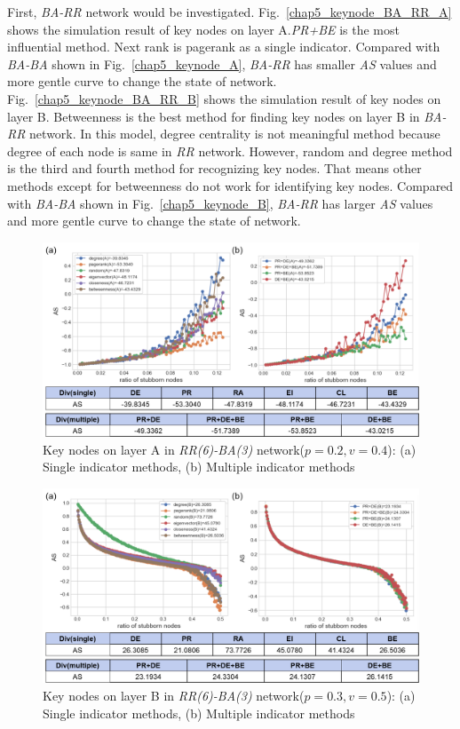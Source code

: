 First, \textit{BA-RR} network would be investigated. Fig.~\ref{chap5_keynode_BA_RR_A} shows the simulation result of key nodes on layer A.\textit{PR+BE} is the most influential method. Next rank is pagerank as a single indicator. Compared with \textit{BA-BA} shown in Fig.~\ref{chap5_keynode_A}, \textit{BA-RR} has smaller \textit{AS} values and more gentle curve to change the state of network. \\
Fig.~\ref{chap5_keynode_BA_RR_B} shows the simulation result of key nodes on layer B. Betweenness is the best method for finding key nodes on layer B in \textit{BA-RR} network. In this model, degree centrality is not meaningful method because degree of each node is same in \textit{RR} network. However, random and degree method is the third and fourth method for recognizing key nodes. That means other methods except for betweenness do not work for identifying key nodes. Compared with \textit{BA-BA} shown in Fig.~\ref{chap5_keynode_B}, \textit{BA-RR} has larger \textit{AS} values and more gentle curve to change the state of network. \\
\begin{figure}[!htb]
	\centering
	\includegraphics[width=\hsize]{figure/chap5_keynode_RR_BA_A.png}
	\caption{Key nodes on layer A in \textit{RR(6)-BA(3)} network($p=0.2, v=0.4$):
		(a) Single indicator methods, (b) Multiple indicator methods}
	\label{chap5_keynode_RR_BA_A}
\end{figure}
\begin{figure}[!htb]
	\centering
	\includegraphics[width=\hsize]{figure/chap5_keynode_RR_BA_B.png}
	\caption{Key nodes on layer B in \textit{RR(6)-BA(3)} network($p=0.3, v=0.5$):
		(a) Single indicator methods, (b) Multiple indicator methods}
	\label{chap5_keynode_RR_BA_B}
\end{figure}
